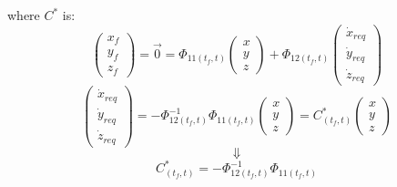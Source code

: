 \documentclass[11pt, a4paper]{article}
\begin{document}
where $C^*$ is:
\begin{equation*}
    \begin{pmatrix}
        x_f\\y_f\\z_f
    \end{pmatrix} = \vec{0} = \Phi_{11(t_f,t)}\begin{pmatrix}
        x\\y\\z
    \end{pmatrix} + \Phi_{12(t_f,t)}\begin{pmatrix}
        \dot{x}_{req}\\\dot{y}_{req}\\\dot{z}_{req}
    \end{pmatrix}
\end{equation*}
\begin{equation*}
    \begin{pmatrix}
        \dot{x}_{req}\\\dot{y}_{req}\\\dot{z}_{req}
    \end{pmatrix} = -\Phi_{12(t_f,t)}^{-1}\Phi_{11(t_f,t)}\begin{pmatrix}
        x\\y\\z
    \end{pmatrix} = C^*_{(t_f,t)}\begin{pmatrix}
        x\\y\\z
    \end{pmatrix}
\end{equation*}
\begin{equation*}
    \Downarrow
\end{equation*}
\begin{equation*}
    C^*_{(t_f,t)} = -\Phi_{12(t_f,t)}^{-1}\Phi_{11(t_f,t)}
\end{equation*}
\end{document}
